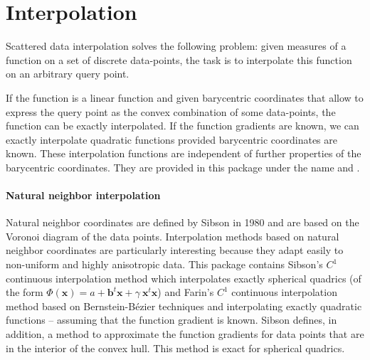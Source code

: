 
\chapter{Interpolation}
\label{chap:Interpolation}

Scattered data interpolation solves the following problem: given
measures of a function on a set of discrete data-points, the task is
to interpolate this function on an arbitrary query point.

If the function is a linear function and given barycentric coordinates
that allow to express the query point as the convex combination of
some data-points, the function can be exactly interpolated. If the
function gradients are known, we can exactly interpolate quadratic
functions provided barycentric coordinates are known. These interpolation
functions are independent of further properties of the barycentric
coordinates. They are provided in this package under the name
 and .\medskip

\subsubsection{Natural neighbor interpolation} Natural neighbor
coordinates are defined by Sibson in 1980 and are based on the Voronoi
diagram of the data points. Interpolation methods based on natural
neighbor coordinates are particularly interesting because they adapt
easily to non-uniform and highly anisotropic data.  This package
contains Sibson's $C^1$ continuous interpolation method which
interpolates exactly spherical quadrics (of the form $\Phi(\mathbf{x})
=a + \mathbf{b}^t \mathbf{x} +\gamma\ \mathbf{x}^t\mathbf{x}$) and
Farin's $C^1$ continuous interpolation method based on
Bernstein-B\'ezier techniques and interpolating exactly quadratic
functions -- assuming that the function gradient is known. Sibson
defines, in addition, a method to approximate the function gradients
for data points that are in the interior of the convex hull. This
method is exact for spherical quadrics.%

